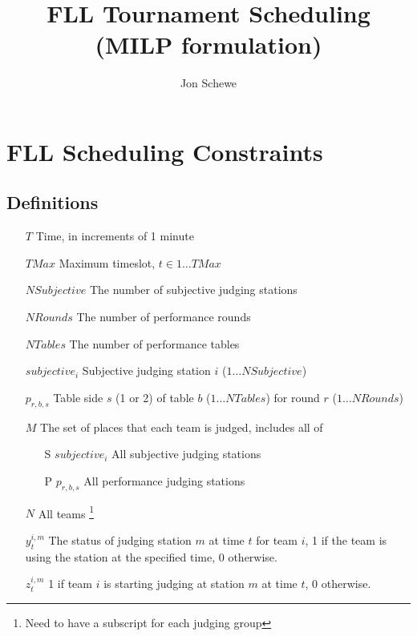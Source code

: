 \documentclass[letterpaper,11pt]{report}
\title{FLL Tournament Scheduling (MILP formulation)}
\author{Jon Schewe}
\newcommand{\doccomment}[3]%
{\marginpar{\textcolor{#2}{\bf #1}}%
\footnote{{\color{#2}#3}}%
}
\newcommand{\doccomment}[3]{}
\newcommand{\jpscomment}[1]%
{\doccomment{SCHEWE}{Bittersweet}{#1}}
\begin{document}
\maketitle

\chapter{FLL Scheduling Constraints}

\section{Definitions}
\begin{itemize}

\item[$T$] Time, in increments of 1 minute
\item[$TMax$] Maximum timeslot, $t \in 1 \dots TMax$  
\item[$NSubjective$] The number of subjective judging stations
\item[$NRounds$] The number of performance rounds
\item[$NTables$] The number of performance tables
\item[$subjective_{i}$] Subjective judging station $i$ ($1 \dots NSubjective$)
\item[$p_{r,b,s}$] Table side $s$ (1 or 2) of table $b$ ($1 \dots NTables$) for
  round $r$ ($1 \dots NRounds$)

\item[$M$] The set of places that each team is judged, includes all of
  \begin{itemize}
  \item[S] $subjective_{i}$ All subjective judging stations
  \item[P] $p_{r,b,s}$ All performance judging stations 
  \end{itemize}

\item[$N$] All teams \jpscomment{Need to have a subscript for each judging
    group}

\item[$y_{t}^{i,m}$] The status of judging station $m$ at time $t$ for team
  $i$, 1 if the team is using the station at the specified time, 0 otherwise.

\item[$z_{t}^{i,m}$] 1 if team $i$ is starting judging at station $m$ at
  time $t$, 0 otherwise.
 

\end{itemize}
\end{document}
